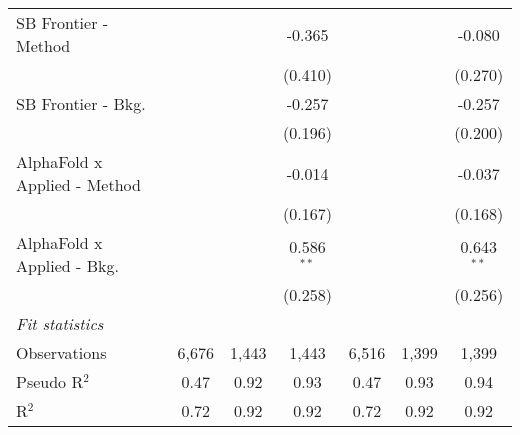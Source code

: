 \begin{tabular}{lcccccc}
   SB Frontier - Method         &                &               & -0.365         &                &              & -0.080\\   
                                &                &               & (0.410)        &                &              & (0.270)\\   
   SB Frontier - Bkg.           &                &               & -0.257         &                &              & -0.257\\   
                                &                &               & (0.196)        &                &              & (0.200)\\   
   AlphaFold x Applied - Method &                &               & -0.014         &                &              & -0.037\\   
                                &                &               & (0.167)        &                &              & (0.168)\\   
   AlphaFold x Applied - Bkg.   &                &               & 0.586$^{**}$   &                &              & 0.643$^{**}$\\   
                                &                &               & (0.258)        &                &              & (0.256)\\   
   \midrule
   \emph{Fit statistics}\\
   Observations                 & 6,676          & 1,443         & 1,443          & 6,516          & 1,399        & 1,399\\  
   Pseudo R$^2$                 & 0.47           & 0.92          & 0.93           & 0.47           & 0.93         & 0.94\\  
   R$^2$                        & 0.72           & 0.92          & 0.92           & 0.72           & 0.92         & 0.92\\  
   

\end{tabular}
